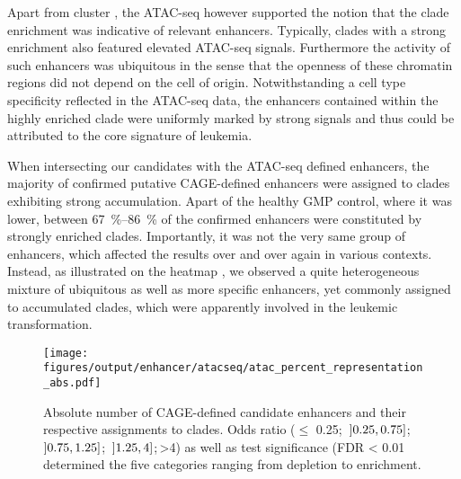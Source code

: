 Apart from cluster , the ATAC-seq however supported the notion that the clade enrichment was indicative of relevant enhancers. Typically, clades with a strong enrichment also featured elevated ATAC-seq signals. Furthermore the activity of such enhancers was ubiquitous in the sense that the openness of these chromatin regions did not depend on the cell of origin. Notwithstanding a cell type specificity reflected in the ATAC-seq data\cite{George2016}, the enhancers contained within the highly enriched clade were uniformly marked by strong signals and thus could be attributed to the core signature of \mllafnine leukemia.

When intersecting our candidates with the ATAC-seq defined enhancers, the majority of confirmed putative CAGE-defined enhancers were assigned to clades exhibiting strong accumulation.  Apart of the healthy GMP control, where it was lower, between \SIrange{67}{86}{\percent} of the confirmed enhancers were constituted by strongly enriched clades. Importantly, it was not the very same group of enhancers, which affected the results over and over again in various contexts. Instead, as illustrated on the heatmap \supplefig, we observed a quite heterogeneous mixture of ubiquitous as well as more specific enhancers, yet commonly assigned to accumulated clades, which were apparently involved in the leukemic transformation. 

 \begin{figure}[!bt]
 	\texttt{[image: figures/output/enhancer/atacseq/atac\_percent\_representation\_abs.pdf]}
 	\caption{Absolute number of CAGE-defined candidate enhancers and their respective assignments to clades. Odds ratio ($\leq$ \num{0.25};\, \ensuremath{\interval[open left]{0.25}{0.75}};\, \ensuremath{\interval[open left]{0.75}{1.25}};\, \ensuremath{\interval[open left]{1.25}{4}};\,>\num{4}) as well as test significance (FDR < \num{0.01} determined the five categories ranging from depletion to enrichment.}
 	\label{fig:enhancers:trowbridge_atac_percent_representation_abs}
 \end{figure}
 
\label{chap:r:enhancers:trowbridgeend} 